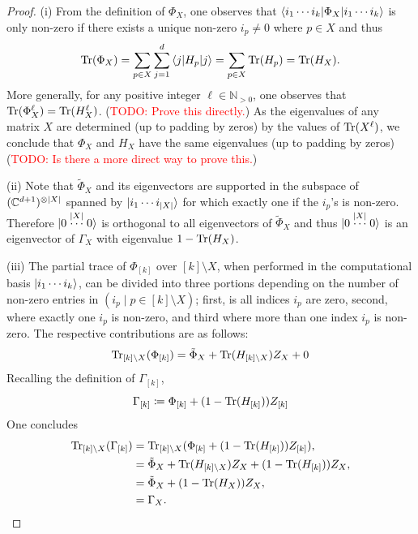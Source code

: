\documentclass[notitlepage, 10pt]{article}
\begin{document}
\begin{proof}
    (i) From the definition of $\Phi_{X}$, one observes that $\braket{i_1\cdots i_k | \Phi_{X} | i_1\cdots i_k}$ is only non-zero if there exists a unique non-zero $i_{p} \neq 0$ where $p \in X$ and thus
    \begin{equation}
        \operatorname{Tr}(\Phi_{X}) = \sum_{p\in X}\sum_{j=1}^{d} \braket{j|H_{p}|j} = \sum_{p\in X} \operatorname{Tr}(H_{p}) = \operatorname{Tr}(H_{X}).
    \end{equation}
    More generally, for any positive integer $\ell \in \mathbb N_{> 0}$, one observes that $\operatorname{Tr}(\Phi_{X}^{\ell}) = \operatorname{Tr}(H_{X}^{\ell})$.
    (\textcolor{red}{TODO: Prove this directly.})
    As the eigenvalues of any matrix $X$ are determined (up to padding by zeros) by the values of $\operatorname{Tr}(X^{\ell})$, we conclude that $\Phi_{X}$ and $H_{X}$ have the same eigenvalues (up to padding by zeros)
    (\textcolor{red}{TODO: Is there a more direct way to prove this.})

    (ii) Note that $\tilde \Phi_{X}$ and its eigenvectors are supported in the subspace of $(\mathbb C^{d+1})^{\otimes \left|X\right|}$ spanned by $\ket{i_1 \cdots i_{\left|X\right|}}$ for which exactly one if the $i_p$'s is non-zero. 
    Therefore $\ket{0\stackrel{\left|X\right|}{\cdots} 0}$ is orthogonal to all eigenvectors of $\tilde \Phi_{X}$ and thus $\ket{0\stackrel{\left|X\right|}{\cdots} 0}$ is an eigenvector of $\Gamma_{X}$ with eigenvalue $1-\operatorname{Tr}(H_X)$.

    (iii) The partial trace of $\Phi_{[k]}$ over $[k]\setminus X$, when performed in the computational basis $\ket{i_1 \cdots i_k}$, can be divided into three portions depending on the number of non-zero entries in $(i_p \mid p \in [k]\setminus X)$; first, is all indices $i_p$ are zero, second, where exactly one $i_p$ is non-zero, and third where more than one index $i_p$ is non-zero.
    The respective contributions are as follows:
    \begin{equation}
        \operatorname{Tr}_{[k]\setminus X}(\Phi_{[k]}) = \tilde \Phi_{X} + \operatorname{Tr}(H_{[k] \setminus X}) Z_{X} + 0
    \end{equation}
    Recalling the definition of $\Gamma_{[k]}$,
    \begin{equation}
        \Gamma_{[k]} \coloneqq \Phi_{[k]} + (1-\operatorname{Tr}(H_{[k]}))Z_{[k]}
    \end{equation}
    One concludes
    \begin{align}
        \begin{split}
            \operatorname{Tr}_{[k]\setminus X} (\Gamma_{[k]})
            &= \operatorname{Tr}_{[k]\setminus X}(\Phi_{[k]} + (1-\operatorname{Tr}(H_{[k]}))Z_{[k]}), \\
            &= \tilde \Phi_{X} + \operatorname{Tr}(H_{[k]\setminus X}) Z_{X} + (1-\operatorname{Tr}(H_{[k]}))Z_{X}, \\
            &= \tilde \Phi_{X} + (1-\operatorname{Tr}(H_{X}))Z_{X}, \\
            &= \Gamma_{X}.
        \end{split}
    \end{align}
\end{proof}
\end{document}
